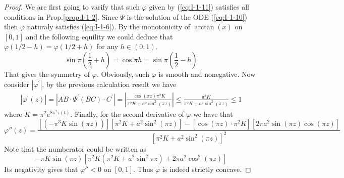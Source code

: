 \begin{proof}
    We are first going to varify that such $\varphi$ given by (\ref{eq:I-1-11}) satisfies all conditions in Prop.\ref{prop:I-1-2}. Since $\Psi$ is the solution of the ODE (\ref{eq:I-1-10}) then $\varphi$ naturaly satisfies (\ref{eq:I-1-6}). By the monotonicity of $\arctan{(x)}$ on $[0,1]$ and the following equility we could deduce that $\varphi(1/2-h)=\varphi(1/2+h)$ for any $h\in(0,1)$.
    \begin{equation*}
        \sin{\pi\left(\frac{1}{2}+h\right)}=\cos{\pi h}=\sin{\pi\left(\frac{1}{2}-h\right)}
    \end{equation*}
    That gives the symmetry of $\varphi$. Obviously, such $\varphi$ is smooth and nonegative. Now consider $\left|\varphi^\prime\right|$, by the previous calculation result we have
    \begin{align*}
        \left|\varphi^\prime(z)\right|=\left|AB\cdot\Psi^\prime(BC)\cdot C^\prime\right|=\left|\frac{\cos{(\pi z)}\pi^2 K}{\pi^2 K+a^2\sin^2{(\pi z)}}\right|\le\frac{\pi^2 K}{\pi^2 K+a^2\sin^2{(\pi z)}}\le 1
    \end{align*}
    where $K=\pi^2 e^{8\pi^2\tau(t)}$. Finally, for the second derivative of $\varphi$ we have that
    \begin{equation*}
        \varphi{''}(z)=\frac{\left[(-\pi^3 K\sin{(\pi z)})\right]\left[\pi^2 K+a^2\sin^2{(\pi z)}\right]-\left[\cos{(\pi z)}\cdot\pi^2 K\right]\left[2\pi a^2\sin{(\pi z)}\cos{(\pi z)}\right]}{{\left[\pi^2 K+a^2\sin^2{(\pi z)}\right]}^2}
    \end{equation*}
    Note that the numberator could be written as
    \begin{equation*}
        -\pi K\sin{(\pi z)}\left[\pi^2 K\left(\pi^2 K+a^2\sin^2{\pi z}\right)+2\pi a^2\cos^2{(\pi z)}\right]
    \end{equation*}
    Its negativity gives that $\varphi{''}<0$ on $[0,1]$. Thus $\varphi$ is indeed strictly concave.
    

\end{proof}
